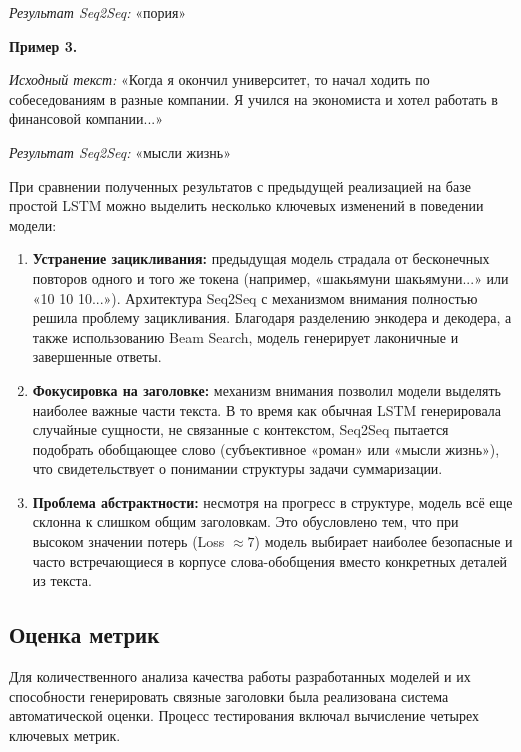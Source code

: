 \documentclass[coursework]{SCWorks}
\begin{document}
    \textit{Результат Seq2Seq:} «пория»

    \textbf{Пример 3.}

    \textit{Исходный текст:} «Когда я окончил университет, то начал ходить по собеседованиям в разные компании. Я учился на экономиста и хотел работать в финансовой компании...»

    \textit{Результат Seq2Seq:} «мысли жизнь»

    При сравнении полученных результатов с предыдущей реализацией на базе простой LSTM можно выделить несколько ключевых изменений в поведении модели:

    \begin{enumerate}
        \item \textbf{Устранение зацикливания:} предыдущая модель страдала от бесконечных повторов одного и того же токена (например, «шакьямуни шакьямуни...» или «10 10 10...»). Архитектура Seq2Seq с механизмом внимания полностью решила проблему зацикливания. Благодаря разделению энкодера и декодера, а также использованию Beam Search, модель генерирует лаконичные и завершенные ответы.
        \item \textbf{Фокусировка на заголовке:} механизм внимания позволил модели выделять наиболее важные части текста. В то время как обычная LSTM генерировала случайные сущности, не связанные с контекстом, Seq2Seq пытается подобрать обобщающее слово (субъективное «роман» или «мысли жизнь»), что свидетельствует о понимании структуры задачи суммаризации.
        \item \textbf{Проблема абстрактности:} несмотря на прогресс в структуре, модель всё еще склонна к слишком общим заголовкам. Это обусловлено тем, что при высоком значении потерь (Loss $\approx 7$) модель выбирает наиболее безопасные и часто встречающиеся в корпусе слова-обобщения вместо конкретных деталей из текста.
    \end{enumerate}

    \subsection{Оценка метрик}

    Для количественного анализа качества работы разработанных моделей и их способности
    генерировать связные заголовки была реализована система автоматической оценки.
    Процесс тестирования включал вычисление четырех ключевых метрик.
\end{document}
